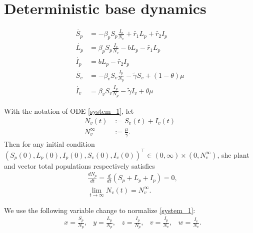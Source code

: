 \section{Deterministic base dynamics}

\begin{equation} 
	\label{system_1} 
	\begin{aligned} 
		\dot{S_p} &= 
			-\beta_p S_p
			\frac{I_v}{N_v} + \tilde{r_1} L_p + \tilde{r_2} I_p  
		\\ 
		\dot{L_p} &= 
			\beta_p S_p
			\frac{I_v}{N_v} - b L_p - \tilde{r_1} L_p  
		\\ 
		\dot{I_p} &= 
			b L_p - \tilde{r_2} I_p  \\ 
		\dot{S_v} &= 
			-\beta_v S_v 
			\frac{I_p}{N_p} - \tilde{\gamma} S_v
			+(1-\theta) \mu  
		\\ 
		\dot{I_v} &= 
			\beta_v S_v \frac{I_p}{N_p} 
			- \tilde{\gamma} I_v
			+ \theta \mu 
	\end{aligned} 
\end{equation} 

\begin{theorem}\label{theorem_1}
	With the notation of ODE \eqref{system_1}, let
	\begin{equation*}
		\begin{aligned}
			N_v(t) &:= S_v(t) + I_v(t) 
		 	\\
		 	N_v^{\infty} &:= \frac{\mu}{\gamma}.
		 \end{aligned}
	\end{equation*}
	Then for any initial condition 
	$
		(S_p(0), L_p(0), I_p(0), S_v(0), I_v(0) )^\top
	 	\in {(0,\infty) \times (0, N^\infty_v)}
	$, she plant and vector total populations respectively satisfies
	\begin{equation*}
		\begin{aligned}
			& \frac{d N_p}{dt} =
				\frac{d}{dt}(S_p + L_p + I_p) = 0,
			\\
			& \lim_{t\to \infty}
				N_v(t) = N_v^{\infty}.
		\end{aligned}
	\end{equation*}
\end{theorem}

We use the following variable change to normalize  \eqref{system_1}:
\begin{equation}
	\label{eqn:normalization}
	\begin{aligned}
		& x = \frac{S_p}{N_p},
		& y = \frac{L_p}{N_p},
		& z = \frac{I_p}{N_p},
		& v = \frac{I_p}{N_v},
		& w = \frac{I_v}{N_v} .
	\end{aligned}
\end{equation}

